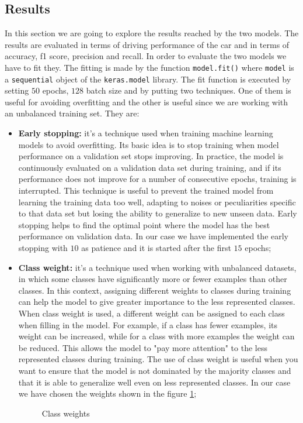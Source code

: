 \subsection{Results}
In this section we are going to explore the results reached by the two models. The results are evaluated in terms of driving performance of the car and in terms of accuracy, f1 score, precision and recall.
In order to evaluate the two models we have to fit they. The fitting is made by the function \verb+model.fit()+ where \verb+model+ is a \verb+sequential+ object of the \verb+keras.model+ library. The fit function is executed by setting $50$ epochs, $128$ batch size and by putting two techniques. One of them is useful for avoiding overfitting and the other is useful since we are working with an unbalanced training set. They are:
\begin{itemize}
\item{\textbf{Early stopping:} it's a technique used when training machine learning models to avoid overfitting. Its basic idea is to stop training when model performance on a validation set stops improving. In practice, the model is continuously evaluated on a validation data set during training, and if its performance does not improve for a number of consecutive epochs, training is interrupted. This technique is useful to prevent the trained model from learning the training data too well, adapting to noises or peculiarities specific to that data set but losing the ability to generalize to new unseen data. Early stopping helps to find the optimal point where the model has the best performance on validation data. In our case we have implemented the early stopping with $10$ as patience and it is started after the first $15$ epochs;}
\item{\textbf{Class weight:} it's a technique used when working with unbalanced datasets, in which some classes have significantly more or fewer examples than other classes. In this context, assigning different weights to classes during training can help the model to give greater importance to the less represented classes. When class weight is used, a different weight can be assigned to each class when filling in the model. For example, if a class has fewer examples, its weight can be increased, while for a class with more examples the weight can be reduced. This allows the model to "pay more attention" to the less represented classes during training. The use of class weight is useful when you want to ensure that the model is not dominated by the majority classes and that it is able to generalize well even on less represented classes. In our case we have chosen the weights shown in the figure \ref{fig: weights};
\begin{figure}[h!]
    \weights
    \caption{Class weights}
    \label{fig: weights}
\end{figure}}
\end{itemize}

